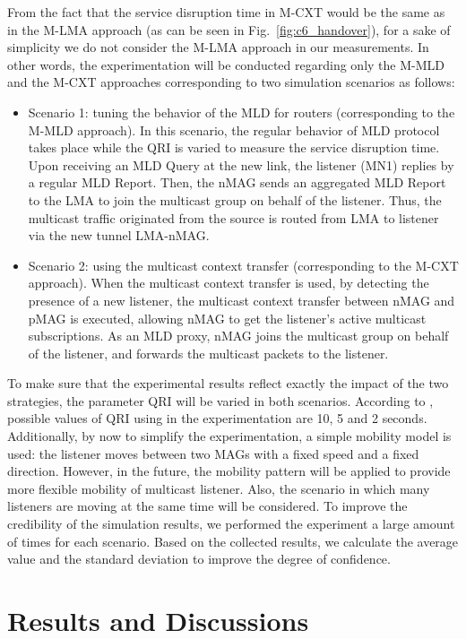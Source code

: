From the fact that the service disruption time in M-CXT would be the same as in the M-LMA approach (as can be seen in Fig.~\ref{fig:c6_handover}), for a sake of simplicity we do not consider the M-LMA approach in our measurements. In other words, the experimentation will be conducted regarding only the M-MLD and the M-CXT approaches corresponding to two simulation scenarios as follows:
\begin{itemize}
\item Scenario 1: tuning the behavior of the MLD for routers (corresponding to the M-MLD approach). In this scenario, the regular behavior of MLD protocol takes place while the QRI is varied to measure the service disruption time. Upon receiving an MLD Query at the new link, the listener (MN1) replies by a regular MLD Report. Then, the nMAG sends an aggregated MLD Report to the LMA to join the multicast group on behalf of the listener. Thus, the multicast traffic originated from the source is routed from LMA to listener via the new tunnel LMA-nMAG. 
\item Scenario 2: using the multicast context transfer (corresponding to the M-CXT approach). When the multicast context transfer is used, by detecting the presence of a new listener, the multicast context transfer between nMAG and pMAG is executed, allowing nMAG to get the listener’s active multicast subscriptions. As an MLD proxy, nMAG joins the multicast group on behalf of the listener, and forwards the multicast packets to the listener.
\end{itemize}

To make sure that the experimental results reflect exactly the impact of the two strategies, the parameter QRI will be varied in both scenarios. According to \cite{MLDv2, tuning_MLD}, possible values of QRI using in the experimentation are 10, 5 and 2 seconds. Additionally, by now to simplify the experimentation, a simple mobility model is used: the listener moves between two MAGs with a fixed speed and a fixed direction. However, in the future, the mobility pattern will be applied to provide more flexible mobility of multicast listener. Also, the scenario in which many listeners are moving at the same time will be considered. To improve the credibility of the simulation results, we performed the experiment a large amount of times for each scenario. Based on the collected results, we calculate the average value and the standard deviation to improve the degree of confidence.

\section{Results and Discussions} \label{section:results}
